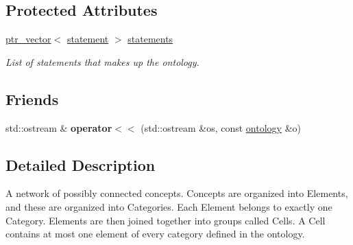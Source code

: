 \subsection*{\-Protected \-Attributes}
\begin{DoxyCompactItemize}
\item 
\hypertarget{classmbdev__ontology_1_1ontology_afe40885a5e07d5c03a85d1112be0af4b}{\hyperlink{classmbdev_1_1ptr__vector}{ptr\-\_\-vector}$<$ \hyperlink{classmbdev__ontology_1_1statement}{statement} $>$ \hyperlink{classmbdev__ontology_1_1ontology_afe40885a5e07d5c03a85d1112be0af4b}{statements}}\label{classmbdev__ontology_1_1ontology_afe40885a5e07d5c03a85d1112be0af4b}

\begin{DoxyCompactList}\small\item\em \-List of statements that makes up the ontology. \end{DoxyCompactList}\end{DoxyCompactItemize}
\subsection*{\-Friends}
\begin{DoxyCompactItemize}
\item 
\hypertarget{classmbdev__ontology_1_1ontology_a75cf9be86fe5d94bad68d0dd50684ce6}{std\-::ostream \& {\bfseries operator$<$$<$} (std\-::ostream \&os, const \hyperlink{classmbdev__ontology_1_1ontology}{ontology} \&o)}\label{classmbdev__ontology_1_1ontology_a75cf9be86fe5d94bad68d0dd50684ce6}

\end{DoxyCompactItemize}


\subsection{\-Detailed \-Description}
\-A network of possibly connected concepts. \-Concepts are organized into \-Elements, and these are organized into \-Categories. \-Each \-Element belongs to exactly one \-Category. \-Elements are then joined together into groups called \-Cells. \-A \-Cell contains at most one element of every category defined in the ontology. 

